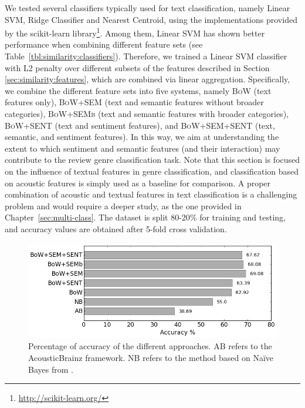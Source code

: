 We tested several classifiers typically used for text classification, namely Linear SVM, Ridge Classifier and Nearest Centroid, using the implementations provided by the scikit-learn library\footnote{\url{http://scikit-learn.org/}}. Among them, Linear SVM has shown better performance when combining different feature sets (see Table~\ref{tbl:similarity:classifiers}). Therefore, we trained a Linear SVM classifier with L2 penalty over different subsets of the features described in Section \ref{sec:similarity:features}, which are combined via linear aggregation. Specifically, we combine the different feature sets into five systems, namely \textsc{BoW} (text features only), \textsc{BoW+SEM} (text and semantic features without broader categories), \textsc{BoW+SEMb} (text and semantic features with broader categories), \textsc{BoW+SENT} (text and sentiment features), and \textsc{BoW+SEM+SENT} (text, semantic, and sentiment features). In this way, we aim at understanding the extent to which sentiment and semantic features (and their interaction) may contribute to the review genre classification task. Note that this section is focused on the influence of textual features in genre classification, and classification based on acoustic features is simply used as a baseline for comparison. A proper combination of acoustic and textual features in text classification is a challenging problem and would require a deeper study, as the one provided in Chapter~\ref{sec:multi-class}.
The dataset is split 80-20\% for training and testing, and accuracy values are obtained after 5-fold cross validation. 

\begin{figure}
    \centering
    \includegraphics[width=0.8\columnwidth]{ch06_similarity_pics/results2_bn.png}
    \caption[Percentage of accuracy of the different approaches.]{Percentage of accuracy of the different approaches. AB refers to the AcousticBrainz framework. NB refers to the method based on Na\"{i}ve Bayes from \cite{Hu2005}.}
    \label{fig:similarity:results}
\end{figure}

